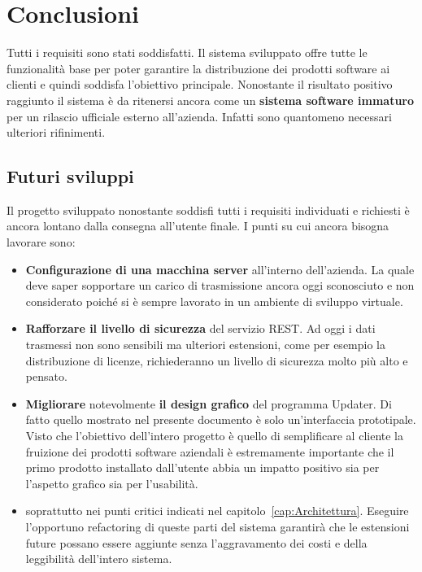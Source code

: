 \documentclass[../RelazioneFinale.tex]{subfiles}
\begin{document}
	\chapter{Conclusioni}
		Tutti i requisiti sono stati soddisfatti. Il sistema sviluppato offre tutte le funzionalità base per poter garantire la distribuzione dei prodotti software ai clienti e quindi soddisfa l'obiettivo principale. Nonostante il risultato positivo raggiunto il sistema è da ritenersi ancora come un \textbf{sistema software immaturo} per un rilascio ufficiale esterno all'azienda. Infatti sono quantomeno necessari ulteriori rifinimenti.
	
		\section{Futuri sviluppi}
			Il progetto sviluppato nonostante soddisfi tutti i requisiti individuati e richiesti è ancora lontano dalla consegna all'utente finale. I punti su cui ancora bisogna lavorare sono:
			\begin{itemize}
				\item \textbf{Configurazione di una macchina server} all'interno dell'azienda. La quale deve saper sopportare un carico di trasmissione ancora oggi sconosciuto e non considerato poiché si è sempre lavorato in un ambiente di sviluppo virtuale.
				\item \textbf{Rafforzare il livello di sicurezza} del servizio REST. Ad oggi i dati trasmessi non sono sensibili ma ulteriori estensioni, come per esempio la distribuzione di licenze, richiederanno un livello di sicurezza molto più alto e pensato.
				\item \textbf{Migliorare} notevolmente \textbf{il design grafico} del programma Updater. Di fatto quello mostrato nel presente documento è solo un'interfaccia prototipale. Visto che l'obiettivo dell'intero progetto è quello di semplificare al cliente la fruizione dei prodotti software aziendali è estremamente importante che il primo prodotto installato dall'utente abbia un impatto positivo sia per l'aspetto grafico sia per l'usabilità.
				\item {} soprattutto nei punti critici indicati nel capitolo~\ref{cap:Architettura}. Eseguire l'opportuno refactoring di queste parti del sistema garantirà che le estensioni future possano essere aggiunte senza l'aggravamento dei costi e della leggibilità dell'intero sistema. 
			\end{itemize}
			
\end{document}
